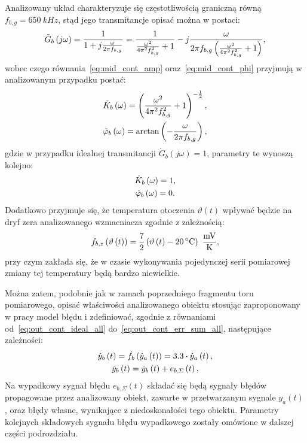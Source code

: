 Analizowany układ charakteryzuje się częstotliwością graniczną równą $f_{b,g} = \qty{650}{kHz}$, stąd jego transmitancje opisać można w postaci:
\begin{equation}
\tilde{G}_{b} \left(j\omega\right) = \frac{1}{1 + j \frac{\omega}{2 \pi f_{b,g}}} = \frac{1}{\frac{\omega^{2}}{4 \pi^{2} f_{b,g}^{2}} + 1} - j \frac{\omega}{2 \pi f_{b,g} \left( \frac{\omega^{2}}{4 \pi^{2} f_{b,g}^{2}} + 1 \right) } \label{eq:sym_partb_trans},
\end{equation}
wobec czego równania~\eqref{eq:mid_cont_amp} oraz~\eqref{eq:mid_cont_phi} przyjmują w analizowanym przypadku postać:
\begin{gather}
\tilde{K}_{b} \left(\omega\right) = \left( \frac{\omega^{2}}{4 \pi^{2} f_{b,g}^{2}} + 1 \right)^{-\frac{1}{2}} \label{eq:sym_partb_amp_real}, \\
\tilde{\varphi}_{b} \left(\omega\right) = \arctan \left( -\frac{\omega}{2 \pi f_{b,g}} \right) \label{eq:sym_partb_phi_real},
\end{gather}
gdzie w przypadku idealnej transmitancji $\dot{G}_{b}(j\omega) = 1$, parametry te wynoszą kolejno:
\begin{gather}
\dot{K}_{b} \left(\omega\right) = 1 \label{eq:sym_partb_amp_ideal}, \\
\dot{\varphi}_{b} \left(\omega\right) = 0 \label{eq:sym_partb_phi_ideal}.
\end{gather}
Dodatkowo przyjmuje się, że temperatura otoczenia $\vartheta(t)$ wpływać będzie na dryf zera analizowanego wzmacniacza zgodnie z zależnością:
\begin{equation}
f_{b,z} \left( \vartheta \emb{t} \right) = \frac{7}{2} \left( \vartheta \emb{t} - \qty{20}{\degreeCelsius} \right)~\unit{\frac{mV}{K}} \label{eq:sym_partb_temp_err},
\end{equation}
przy czym zakłada się, że w czasie wykonywania pojedynczej serii pomiarowej zmiany tej temperatury będą bardzo niewielkie.

Można zatem, podobnie jak w ramach poprzedniego fragmentu toru pomiarowego, opisać właściwości analizowanego obiektu stosując zaproponowany w pracy model błędu i zdefiniować, zgodnie z równaniami od~\eqref{eq:out_cont_ideal_all} do~\eqref{eq:out_cont_err_sum_all}, następujące zależności:
\begin{gather}
\dot{y}_{b} \left(t\right) = \dot{f}_{b} \left( \dot{y}_{a} \left(t\right) \right) = 3.3 \cdot \dot{y}_{a} \left(t\right) \label{eq:sym_partb_out_ideal}, \\
\tilde{y}_{b} \left(t\right) = \dot{y}_{b} \left(t\right) + e_{b,\Sigma} \left(t\right) \label{eq:sym_partb_out_real},
\end{gather}
Na wypadkowy sygnał błędu $e_{b,\Sigma}(t)$ składać się będą sygnały błędów propagowane przez analizowany obiekt, zawarte w przetwarzanym sygnale $y_{a}(t)$, oraz błędy własne, wynikające z niedoskonałości tego obiektu. Parametry kolejnych składowych sygnału błędu wypadkowego zostały omówione w dalszej części podrozdziału.

